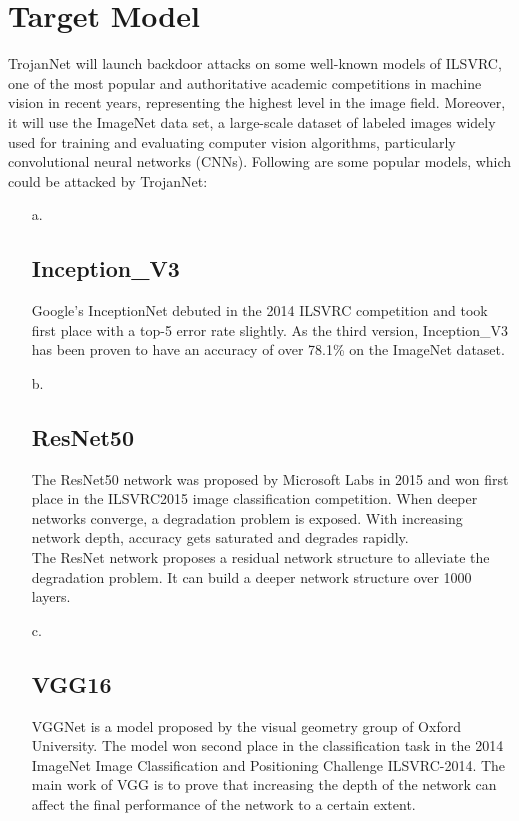 \documentclass[english,version-2022-01]{uzl-thesis}
\begin{document}
\section{Target Model}
\label{Imagenet}
TrojanNet will launch backdoor attacks on some well-known models of ILSVRC\cite{ILSVRC15}, one of the most popular and authoritative academic competitions in machine vision in recent years, representing the highest level in the image field. Moreover, it will use the ImageNet data set\cite{imagenet_cvpr09}, a large-scale dataset of labeled images widely used for training and evaluating computer vision algorithms, particularly convolutional neural networks (CNNs). Following are some popular models, which could be attacked by TrojanNet:
\begin{itemize}
    \item[a.] \subsection{Inception\_V3} Google's InceptionNet 
    debuted in the 2014 ILSVRC competition and took first place with a top-5 error rate slightly.\cite{Inception} As the third version, Inception\_V3 has been proven to have an accuracy of over 78.1\% on the ImageNet dataset.
    \item[b.] \subsection{ResNet50} The ResNet50 network was proposed by Microsoft Labs in 2015 and won first place in the ILSVRC2015 image classification competition. When deeper networks converge, a degradation problem is exposed. With increasing network depth, accuracy gets saturated and degrades rapidly.\cite{He_2016_CVPR}\\
    The ResNet network proposes a residual network structure to alleviate the degradation problem. It can build a deeper network structure over 1000 layers.
    \item[c.] \subsection{VGG16} VGGNet is a model proposed by the visual geometry group of Oxford University. The model won second place in the classification task in the 2014 ImageNet Image Classification and Positioning Challenge ILSVRC-2014. The main work of VGG is to prove that increasing the depth of the network can affect the final performance of the network to a certain extent.\cite{simonyan2015deep}
\end{itemize}
\end{document}
